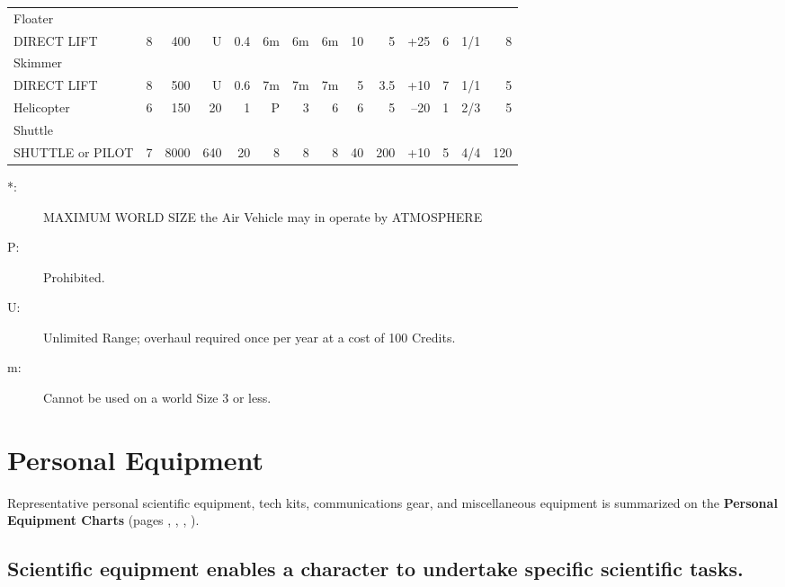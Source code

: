 \begin{table}[htbp]
{\begin{minipage}{0.95\textwidth}
\begin{tabular}{lcrrrrrrrrrrrr}
        \rowcolor{grey}
        Floater &&&&&&&&&&&&&\\
        \rowcolor{grey}
        {\footnotesize DIRECT LIFT} & 8 & 400 & U & 0.4 & 6m & 6m & 6m & 10 & 5 & +25 & 6 & 1/1 & 8 \\
        Skimmer &&&&&&&&&&&&&\\
        {\footnotesize DIRECT LIFT} & 8 & 500 & U & 0.6 & 7m & 7m & 7m & 5 & 3.5 & +10 & 7 & 1/1 & 5 \\
        \rowcolor{grey}
        Helicopter & 6 & 150 & 20 & 1 & P & 3 & 6 & 6 & 5 & --20 & 1 & 2/3 & 5 \\
        Shuttle &&&&&&&&&&&&&\\
        {\footnotesize SHUTTLE or PILOT} & 7 & 8000 & 640 & 20 & 8 & 8 & 8 & 40 & 200 & +10 & 5 & 4/4 & 120 
      \end{tabular}

      \medskip

      \parbox{\textwidth}{\begin{description}
        \item[*:] MAXIMUM WORLD SIZE the Air Vehicle may in operate by
          ATMOSPHERE 
        \item[P:] Prohibited. 
        \item[U:] Unlimited Range; overhaul required once per year at a cost
          of 100 Credits. 
        \item[m:] Cannot be used on a world Size 3 or less. 
        \end{description}}
    \end{minipage}}
\end{table}

\section{Personal Equipment}
\label{sec:personal-equipment}

Representative personal scientific equipment, tech kits,
communications gear, and miscellaneous equipment is summarized on the
\textbf{Personal Equipment Charts} (pages
\pageref{tab:scientific-equipment}, \pageref{tab:repair-equipment},
\pageref{tab:comm-equip}, \pageref{tab:misc-equip}).\label{sec:personal-equipment-split-tables}

\subsection[Scientific Equipment]{Scientific equipment enables a
  character to undertake specific scientific tasks.}
\label{sec:scientific-equip}

